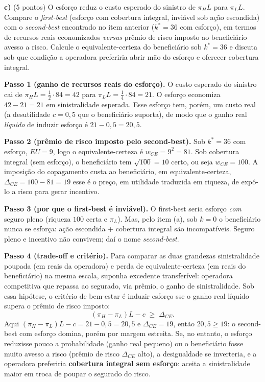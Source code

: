 \textbf{c)} (5 pontos) O esfor\c{c}o reduz o custo esperado do sinistro de $\pi_H L$ para $\pi_L L$. Compare o \emph{first-best} (esfor\c{c}o com cobertura integral, invi\'avel sob a\c{c}\~ao escondida) com o \emph{second-best} encontrado no item anterior ($k^*=36$ com esfor\c{c}o), em termos de recursos reais economizados \emph{versus} pr\^emio de risco imposto ao benefici\'ario avesso a risco. Calcule o equivalente-certeza do benefici\'ario sob $k^*=36$ e discuta sob que condi\c{c}\~ao a operadora preferiria abrir m\~ao do esfor\c{c}o e oferecer cobertura integral.
\resolucaobox{7.6cm}
\begin{solucao}
\textbf{Passo 1 (ganho de recursos reais do esfor\c{c}o).} O custo esperado do sinistro cai de $\pi_H L = \tfrac{1}{2}\cdot 84 = 42$ para $\pi_L L = \tfrac{1}{4}\cdot 84 = 21$. O esfor\c{c}o economiza $42 - 21 = 21$ em sinistralidade esperada. Esse esfor\c{c}o tem, por\'em, um custo real (a desutilidade $c=0{,}5$ que o benefici\'ario suporta), de modo que o ganho real \emph{l\'iquido} de induzir esfor\c{c}o \'e $21 - 0{,}5 = 20{,}5$.

\textbf{Passo 2 (pr\^emio de risco imposto pelo second-best).} Sob $k^*=36$ com esfor\c{c}o, $EU = 9$, logo o equivalente-certeza \'e $w_{CE} = 9^2 = 81$. Sob cobertura integral (sem esfor\c{c}o), o benefici\'ario tem $\sqrt{100}=10$ certo, ou seja $w_{CE}=100$. A imposi\c{c}\~ao do copagamento custa ao benefici\'ario, em equivalente-certeza, $\Delta_{CE}=100 - 81 = 19$ \textemdash{} esse \'e o pre\c{c}o, em utilidade traduzida em riqueza, de exp\^o-lo a risco para gerar incentivo.

\textbf{Passo 3 (por que o first-best \'e invi\'avel).} O first-best seria esfor\c{c}o \emph{com} seguro pleno (riqueza $100$ certa e $\pi_L$). Mas, pelo item (a), sob $k=0$ o benefici\'ario nunca se esfor\c{c}a: a\c{c}\~ao escondida + cobertura integral s\~ao incompat\'iveis. Seguro pleno e incentivo n\~ao convivem; da\'i o nome \emph{second-best}.

\textbf{Passo 4 (trade-off e crit\'erio).} Para comparar as duas grandezas \textemdash{} sinistralidade poupada (em reais da operadora) e perda de equivalente-certeza (em reais do benefici\'ario) \textemdash{} na mesma escala, suponha excedente transfer\'ivel: operadora competitiva que repassa ao segurado, via pr\^emio, o ganho de sinistralidade. Sob essa hip\'otese, o crit\'erio de bem-estar \'e induzir esfor\c{c}o sse o ganho real l\'iquido supera o pr\^emio de risco imposto:
\[
(\pi_H-\pi_L)L - c \;\ge\; \Delta_{CE}.
\]
Aqui $(\pi_H-\pi_L)L - c = 21 - 0{,}5 = 20{,}5$ e $\Delta_{CE}=19$, ent\~ao $20{,}5 \ge 19$: o second-best com esfor\c{c}o domina, por\'em por margem estreita. Se, no entanto, o esfor\c{c}o reduzisse pouco a probabilidade (ganho real pequeno) ou o benefici\'ario fosse muito avesso a risco (pr\^emio de risco $\Delta_{CE}$ alto), a desigualdade se inverteria, e a operadora preferiria \textbf{cobertura integral sem esfor\c{c}o}: aceita a sinistralidade maior em troca de poupar o segurado do risco.


\end{solucao}
